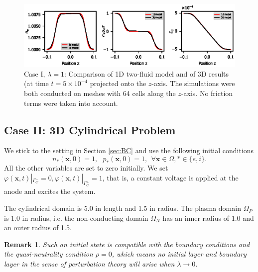 \documentclass{article}
\newtheorem*{remark}{Remark}
\begin{document}
\begin{figure}
    \centering
    \includegraphics[scale=1.2]{z_axis_reduction.eps}
    \caption{Case I, $\lambda = 1$: Comparison of 1D two-fluid model and of 3D results (at
      time $t = 5 \times 10^{-4}$ projected onto the $z$-axis. The simulations were both
      conducted on meshes with 64 cells along the $z$-axis. No friction terms were taken
      into account.}
    \label{fig:z_axis_reduction}
\end{figure}

\subsection{Case II: 3D Cylindrical Problem}

We stick to the setting in Section \ref{sec:BC} and use the following initial conditions
\begin{equation*}
    n_\ast(\mathbf{x}, 0) = 1, \ \ \  p_\ast(\mathbf{x},0) = 1, \ \ \forall \mathbf{x}\in\Omega, \ast \in \{e, i\}.
\end{equation*}
All the other variables are set to zero initially. We set $\varphi(\mathbf{x}, t)|_{\Gamma_C^-} = 0, \varphi(\mathbf{x}, t)|_{\Gamma_C^+} = 1$, that is, a constant voltage is applied at the anode and excites the system. 

The cylindrical domain is 5.0 in length and 1.5 in radius. The plasma domain $\Omega_P$ is
1.0 in radius, i.e. the non-conducting domain $\Omega_N$ has an inner radius of 1.0 and an
outer radius of 1.5.

\begin{remark}
  Such an initial state is compatible with the boundary conditions and the quasi-neutrality
  condition $\rho = 0$, which means no initial layer and boundary layer in the sense of
  perturbation theory will arise when $\lambda \rightarrow 0$.
\end{remark}
\end{document}
